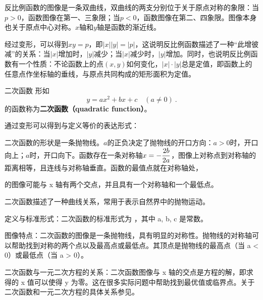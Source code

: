 反比例函数的图像是一条双曲线，双曲线的两支分别位于关于原点对称的象限：当$p>0$，函数图像在第一、三象限；当$p<0$，函数图像在第二、四象限。图像本身也关于原点中心对称。$x$轴和$y$轴是函数的渐近线。

经过变形，可以得到$xy=p$，即$|x||y|=|p|$，这说明反比例函数描述了一种“此增彼减”的关系：当$|x|$增加时，$|y|$减少；当$|x|$减少时，$|y|$增加。同时，也说明反比例函数有一个性质：不论函数上的点$(x,y)$如何变化，$|x|\cdot|y|$总是定值，即函数上的任意点作坐标轴的垂线，与原点共同构成的矩形面积为定值。

\begin{definition}{二次函数}
形如
\begin{equation}
y = ax^2 + bx + c\quad(a\neq0)~.
\end{equation}
的函数称为\textbf{二次函数（quadratic function）}。
\end{definition}

通过变形可以得到与定义等价的表达形式：


二次函数的形状是一条抛物线。$a$的正负决定了抛物线的开口方向：$a>0$时，开口向上；$a$时，开口向下。函数存在一条对称轴$\displaystyle x=-{2b\over 2a}$，图像上对称点到对称轴的距离相等，且连线与对称轴垂直。函数的最值点就在对称轴处，

的图像可能与  x  轴有两个交点，并且具有一个对称轴和一个最低点。


二次函数描述了一种曲线关系，常用于表示自然界中的抛物运动。

定义与标准形式：二次函数的标准形式为   ，其中 a, b, c 是常数。

图像特点：二次函数的图像是一条抛物线，具有明显的对称性。抛物线的对称轴可以帮助找到对称的两个点以及最高点或最低点。其顶点是抛物线的最高点（当 a < 0）或最低点（当 a > 0）。

二次函数与一元二次方程的关系：二次函数图像与 x 轴的交点是方程的解，即求得的 x 值可以使得 y 为零。这在很多实际问题中帮助找到最优值或临界点。关于二次函数和一元二次方程的具体关系参见。
